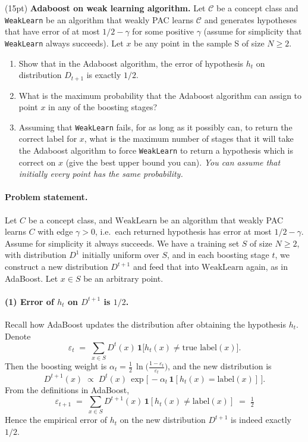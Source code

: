 \documentclass[11pt]{article}
\newcommand*{\C}{{\mathcal C}}
\DeclareMathOperator{\1}{\mathbbm{1}}
\begin{document}
\begin{problem}(15pt) \textbf{Adaboost on weak learning algorithm.}  
Let $\C$ be a concept class and {\tt WeakLearn} be an algorithm that weakly PAC
learns $\C$ and generates hypotheses that have error of at most $1/2-\gamma$
for some positive $\gamma$ (assume for simplicity that {\tt WeakLearn} always
succeeds). Let $x$ be any point in the sample S of size $N \geq 2$.
\begin{enumerate}
\item Show that in the Adaboost algorithm, the error of hypothesis $h_t$ on
distribution $D_{t+1}$ is exactly $1/2.$
\item What is the maximum probability that the Adaboost algorithm can assign to
point $x$ in any of the boosting stages?
\item Assuming  that {\tt WeakLearn} fails, for as long as it possibly can, to
return the correct label for $x$, what is the maximum number of stages that it
will take the Adaboost algorithm to force  {\tt WeakLearn} to return a
hypothesis which is correct on $x$ (give the best upper bound you can). {\em You
can assume that initially every point has the same probability.}
\end{enumerate}
\end{problem}

\noindent
\paragraph{Problem statement.}
Let $C$ be a concept class, and $\text{WeakLearn}$ be an algorithm that weakly PAC learns $C$ with edge $\gamma>0$, i.e.\ each returned hypothesis has error at most $1/2-\gamma$. Assume for simplicity it always succeeds.  We have a training set $S$ of size $N \ge 2$, with distribution $D^1$ initially uniform over $S$, and in each boosting stage $t$, we construct a new distribution $D^{t+1}$ and feed that into $\text{WeakLearn}$ again, as in AdaBoost.  Let $x \in S$ be an arbitrary point.

\paragraph{(1) Error of $h_t$ on $D^{t+1}$ is $1/2$.}
Recall how AdaBoost updates the distribution after obtaining the hypothesis $h_t$.  Denote
\[
\varepsilon_t \;=\; \sum_{x\in S} D^t(x)\,\mathbf{1}\bigl[h_t(x)\neq \text{true~label}(x)\bigr].
\]
Then the boosting weight is $\alpha_t = \tfrac12\,\ln\!\bigl(\tfrac{1-\varepsilon_t}{\varepsilon_t}\bigr)$, and the new distribution is 
\[
D^{t+1}(x) \;\propto\; 
D^t(x)\,\exp\!\bigl[\,-\alpha_t\,\mathbf{1}[h_t(x)=\text{label}(x)]\,\bigr].
\]
From the definitions in AdaBoost, 
\[
\varepsilon_{t+1}
\;=\;
\sum_{x\in S} D^{t+1}(x)\,\mathbf{1}[h_t(x)\neq \text{label}(x)]
\;=\;\tfrac12
\]
Hence the empirical error of $h_t$ on the new distribution $D^{t+1}$ is indeed exactly $1/2$.
\end{document}
